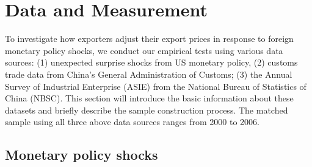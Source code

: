 \newpage
\section{Data and Measurement \label{sec:data}}

To investigate how exporters adjust their export prices in response to foreign monetary policy shocks, we conduct our empirical tests using various data sources: (1) unexpected surprise shocks from US monetary policy, (2) customs trade data from China’s General Administration of Customs; (3) the Annual Survey of Industrial Enterprise (ASIE) from the National Bureau of Statistics of China (NBSC). This section will introduce the basic information about these datasets and briefly describe the sample construction process. The matched sample using all three above data sources ranges from 2000 to 2006.

\subsection{Monetary policy shocks}

